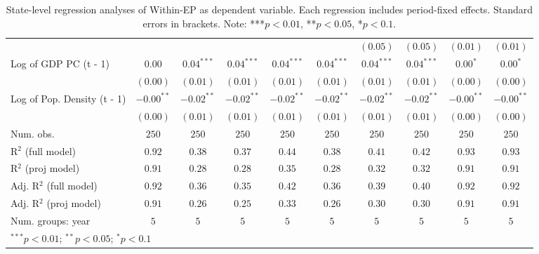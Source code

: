 \begin{table}
\begin{center}
\begin{tabular}{l c c c c c c c c c}
                                  &              &              &              &              &              & $(0.05)$     & $(0.05)$     & $(0.01)$     & $(0.01)$     \\
Log of GDP PC (t - 1)             & $0.00$       & $0.04^{***}$ & $0.04^{***}$ & $0.04^{***}$ & $0.04^{***}$ & $0.04^{***}$ & $0.04^{***}$ & $0.00^{*}$   & $0.00^{*}$   \\
                                  & $(0.00)$     & $(0.01)$     & $(0.01)$     & $(0.01)$     & $(0.01)$     & $(0.01)$     & $(0.01)$     & $(0.00)$     & $(0.00)$     \\
Log of Pop. Density (t - 1)       & $-0.00^{**}$ & $-0.02^{**}$ & $-0.02^{**}$ & $-0.02^{**}$ & $-0.02^{**}$ & $-0.02^{**}$ & $-0.02^{**}$ & $-0.00^{**}$ & $-0.00^{**}$ \\
                                  & $(0.00)$     & $(0.01)$     & $(0.01)$     & $(0.01)$     & $(0.01)$     & $(0.01)$     & $(0.01)$     & $(0.00)$     & $(0.00)$     \\
\hline
Num. obs.                         & $250$        & $250$        & $250$        & $250$        & $250$        & $250$        & $250$        & $250$        & $250$        \\
R$^2$ (full model)                & $0.92$       & $0.38$       & $0.37$       & $0.44$       & $0.38$       & $0.41$       & $0.42$       & $0.93$       & $0.93$       \\
R$^2$ (proj model)                & $0.91$       & $0.28$       & $0.28$       & $0.35$       & $0.28$       & $0.32$       & $0.32$       & $0.91$       & $0.91$       \\
Adj. R$^2$ (full model)           & $0.92$       & $0.36$       & $0.35$       & $0.42$       & $0.36$       & $0.39$       & $0.40$       & $0.92$       & $0.92$       \\
Adj. R$^2$ (proj model)           & $0.91$       & $0.26$       & $0.25$       & $0.33$       & $0.26$       & $0.30$       & $0.30$       & $0.91$       & $0.91$       \\
Num. groups: year                 & $5$          & $5$          & $5$          & $5$          & $5$          & $5$          & $5$          & $5$          & $5$          \\
\hline
\multicolumn{10}{l}{\scriptsize{$^{***}p<0.01$; $^{**}p<0.05$; $^{*}p<0.1$}}
\end{tabular}
\caption{State-level regression analyses of Within-EP as dependent variable. Each regression includes period-fixed effects. Standard errors in brackets. Note: ***$p<0.01$, **$p<0.05$, *$p<0.1$.}
\label{tab:within_epi_1}
\end{center}
\end{table}

